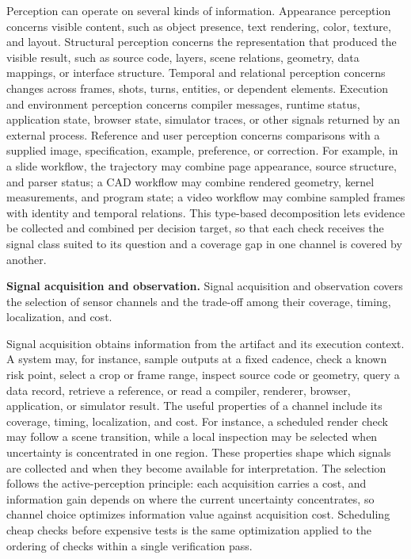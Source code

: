 Perception can operate on several kinds of information. Appearance perception concerns visible content, such as object presence, text rendering, color, texture, and layout. Structural perception concerns the representation that produced the visible result, such as source code, layers, scene relations, geometry, data mappings, or interface structure. Temporal and relational perception concerns changes across frames, shots, turns, entities, or dependent elements. Execution and environment perception concerns compiler messages, runtime status, application state, browser state, simulator traces, or other signals returned by an external process. Reference and user perception concerns comparisons with a supplied image, specification, example, preference, or correction. For example, in a slide workflow, the trajectory may combine page appearance, source structure, and parser status; a CAD workflow may combine rendered geometry, kernel measurements, and program state; a video workflow may combine sampled frames with identity and temporal relations. This type-based decomposition lets evidence be collected and combined per decision target, so that each check receives the signal class suited to its question and a coverage gap in one channel is covered by another.

\textbf{Signal acquisition and observation.} Signal acquisition and observation covers the selection of sensor channels and the trade-off among their coverage, timing, localization, and cost.

Signal acquisition obtains information from the artifact and its execution context. A system may, for instance, sample outputs at a fixed cadence, check a known risk point, select a crop or frame range, inspect source code or geometry, query a data record, retrieve a reference, or read a compiler, renderer, browser, application, or simulator result. The useful properties of a channel include its coverage, timing, localization, and cost. For instance, a scheduled render check may follow a scene transition, while a local inspection may be selected when uncertainty is concentrated in one region. These properties shape which signals are collected and when they become available for interpretation. The selection follows the active-perception principle: each acquisition carries a cost, and information gain depends on where the current uncertainty concentrates, so channel choice optimizes information value against acquisition cost. Scheduling cheap checks before expensive tests is the same optimization applied to the ordering of checks within a single verification pass.

